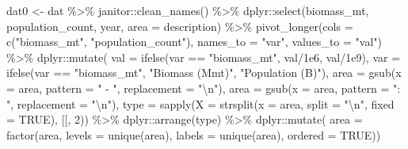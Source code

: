 \documentclass[
  letterpaper,
  oneside,
  open=any]{scrbook}
\newenvironment{Shaded}{\begin{snugshade}}{\end{snugshade}}
\newcommand{\AttributeTok}[1]{\textcolor[rgb]{0.40,0.45,0.13}{#1}}
\newcommand{\ConstantTok}[1]{\textcolor[rgb]{0.56,0.35,0.01}{#1}}
\newcommand{\DecValTok}[1]{\textcolor[rgb]{0.68,0.00,0.00}{#1}}
\newcommand{\FloatTok}[1]{\textcolor[rgb]{0.68,0.00,0.00}{#1}}
\newcommand{\FunctionTok}[1]{\textcolor[rgb]{0.28,0.35,0.67}{#1}}
\newcommand{\NormalTok}[1]{\textcolor[rgb]{0.00,0.23,0.31}{#1}}
\newcommand{\OtherTok}[1]{\textcolor[rgb]{0.00,0.23,0.31}{#1}}
\newcommand{\SpecialCharTok}[1]{\textcolor[rgb]{0.37,0.37,0.37}{#1}}
\newcommand{\StringTok}[1]{\textcolor[rgb]{0.13,0.47,0.30}{#1}}
\begin{document}
\begin{Shaded}
\begin{Highlighting}[]
\NormalTok{dat0 }\OtherTok{\textless{}{-}}\NormalTok{ dat }\SpecialCharTok{\%\textgreater{}\%} 
\NormalTok{  janitor}\SpecialCharTok{::}\FunctionTok{clean\_names}\NormalTok{() }\SpecialCharTok{\%\textgreater{}\%} 
\NormalTok{  dplyr}\SpecialCharTok{::}\FunctionTok{select}\NormalTok{(biomass\_mt, population\_count, year, }\AttributeTok{area =}\NormalTok{ description) }\SpecialCharTok{\%\textgreater{}\%}
  \FunctionTok{pivot\_longer}\NormalTok{(}\AttributeTok{cols =} \FunctionTok{c}\NormalTok{(}\StringTok{"biomass\_mt"}\NormalTok{, }\StringTok{"population\_count"}\NormalTok{), }
               \AttributeTok{names\_to =} \StringTok{"var"}\NormalTok{, }
               \AttributeTok{values\_to =} \StringTok{"val"}\NormalTok{) }\SpecialCharTok{\%\textgreater{}\%} 
\NormalTok{  dplyr}\SpecialCharTok{::}\FunctionTok{mutate}\NormalTok{(}
    \AttributeTok{val =} \FunctionTok{ifelse}\NormalTok{(var }\SpecialCharTok{==} \StringTok{"biomass\_mt"}\NormalTok{, val}\SpecialCharTok{/}\FloatTok{1e6}\NormalTok{, val}\SpecialCharTok{/}\FloatTok{1e9}\NormalTok{), }
    \AttributeTok{var =} \FunctionTok{ifelse}\NormalTok{(var }\SpecialCharTok{==} \StringTok{"biomass\_mt"}\NormalTok{, }\StringTok{"Biomass (Mmt)"}\NormalTok{, }\StringTok{"Population (B)"}\NormalTok{), }
    \AttributeTok{area =} \FunctionTok{gsub}\NormalTok{(}\AttributeTok{x =}\NormalTok{ area, }\AttributeTok{pattern =} \StringTok{" {-} "}\NormalTok{, }\AttributeTok{replacement =} \StringTok{"}\SpecialCharTok{\textbackslash{}n}\StringTok{"}\NormalTok{), }
    \AttributeTok{area =} \FunctionTok{gsub}\NormalTok{(}\AttributeTok{x =}\NormalTok{ area, }\AttributeTok{pattern =} \StringTok{": "}\NormalTok{, }\AttributeTok{replacement =} \StringTok{"}\SpecialCharTok{\textbackslash{}n}\StringTok{"}\NormalTok{), }
    \AttributeTok{type =} \FunctionTok{sapply}\NormalTok{(}\AttributeTok{X =} \FunctionTok{strsplit}\NormalTok{(}\AttributeTok{x =}\NormalTok{ area, }\AttributeTok{split =} \StringTok{"}\SpecialCharTok{\textbackslash{}n}\StringTok{"}\NormalTok{, }\AttributeTok{fixed =} \ConstantTok{TRUE}\NormalTok{), }\StringTok{\textasciigrave{}}\AttributeTok{[[}\StringTok{\textasciigrave{}}\NormalTok{, }\DecValTok{2}\NormalTok{))  }\SpecialCharTok{\%\textgreater{}\%} 
\NormalTok{  dplyr}\SpecialCharTok{::}\FunctionTok{arrange}\NormalTok{(type) }\SpecialCharTok{\%\textgreater{}\%} 
\NormalTok{  dplyr}\SpecialCharTok{::}\FunctionTok{mutate}\NormalTok{(}
    \AttributeTok{area =} \FunctionTok{factor}\NormalTok{(area, }\AttributeTok{levels =} \FunctionTok{unique}\NormalTok{(area), }\AttributeTok{labels =} \FunctionTok{unique}\NormalTok{(area), }\AttributeTok{ordered =} \ConstantTok{TRUE}\NormalTok{))}


\end{Highlighting}
\end{Shaded}
\end{document}
